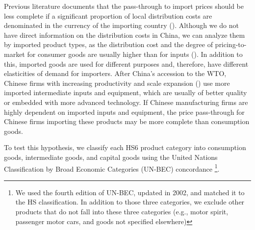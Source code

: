 Previous literature documents that the pass-through to import prices should be less complete if a significant proportion of local distribution costs are denominated in the currency of the importing country (\cite{campa2005}). Although we do not have direct information on the distribution costs in China, we can analyze them by imported product types, as the distribution cost and the degree of pricing-to-market for consumer goods are usually higher than for inputs (\cite{bmm2012}). In addition to this, imported goods are used for different purposes and, therefore, have different elasticities of demand for importers. After China's accession to the WTO, Chinese firms with increasing productivity and scale expansion (\cite{chor2021growing}) use more imported intermediate inputs and equipment, which are usually of better quality or embedded with more advanced technology. If Chinese manufacturing firms are highly dependent on imported inputs and equipment, the price pass-through for Chinese firms importing these products may be more complete than consumption goods.

To test this hypothesis, we classify each HS6 product category into consumption goods, intermediate goods, and capital goods using the United Nations Classification by Broad Economic Categories (UN-BEC) concordance \footnote{We used the fourth edition of UN-BEC, updated in 2002, and matched it to the HS classification. In addition to those three categories, we exclude other products that do not fall into these three categories (e.g., motor spirit, passenger motor cars, and goods not specified elsewhere)}.

